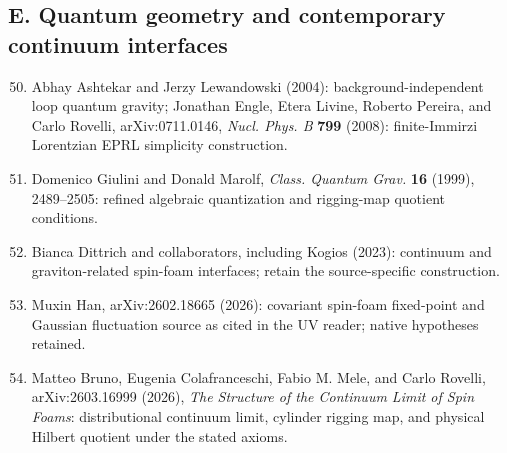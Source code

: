 \documentclass[10pt]{article}
\begin{document}
\subsection*{E. Quantum geometry and contemporary continuum interfaces}
\begin{enumerate}[itemsep=1pt,topsep=3pt]\setcounter{enumi}{49}
\item Abhay Ashtekar and Jerzy Lewandowski (2004): background-independent loop quantum gravity; Jonathan Engle, Etera Livine, Roberto Pereira, and Carlo Rovelli, arXiv:0711.0146, \emph{Nucl. Phys. B} \textbf{799} (2008): finite-Immirzi Lorentzian EPRL simplicity construction.
\item Domenico Giulini and Donald Marolf, \emph{Class. Quantum Grav.} \textbf{16} (1999), 2489--2505: refined algebraic quantization and rigging-map quotient conditions.
\item Bianca Dittrich and collaborators, including Kogios (2023): continuum and graviton-related spin-foam interfaces; retain the source-specific construction.
\item Muxin Han, arXiv:2602.18665 (2026): covariant spin-foam fixed-point and Gaussian fluctuation source as cited in the UV reader; native hypotheses retained.
\item Matteo Bruno, Eugenia Colafranceschi, Fabio M. Mele, and Carlo Rovelli, arXiv:2603.16999 (2026), \emph{The Structure of the Continuum Limit of Spin Foams}: distributional continuum limit, cylinder rigging map, and physical Hilbert quotient under the stated axioms.
\end{enumerate}
\end{document}
